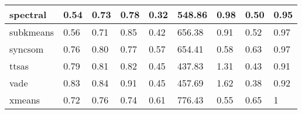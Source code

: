 \begin{table}[H]
\begin{tabular}{|l|l|l|l|l|l|l|l|l|}
\hline
spectral & 0.54 & 0.73 & 0.78 & 0.32 & 548.86 & 0.98 & 0.50 & 0.95 \\
\hline
subkmeans & 0.56 & 0.71 & 0.85 & 0.42 & 656.38 & 0.91 & 0.52 & 0.97 \\
\hline
syncsom & 0.76 & 0.80 & 0.77 & 0.57 & 654.41 & 0.58 & 0.63 & 0.97 \\
\hline
ttsas & 0.79 & 0.81 & 0.82 & 0.45 & 437.83 & 1.31 & 0.43 & 0.91 \\
\hline
vade & 0.83 & 0.84 & 0.91 & 0.45 & 457.69 & 1.62 & 0.38 & 0.92 \\
\hline
xmeans & 0.72 & 0.76 & 0.74 & 0.61 & 776.43 & 0.55 & 0.65 & 1 \\
\hline
\end{tabular}
\end{table}